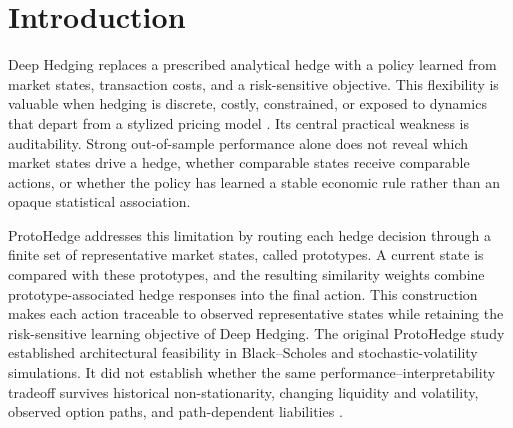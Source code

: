 \documentclass[sigconf]{acmart}
\begin{document}




\maketitle


\section{Introduction}
Deep Hedging replaces a prescribed analytical hedge with a policy learned
from market states, transaction costs, and a risk-sensitive objective. This
flexibility is valuable when hedging is discrete, costly, constrained, or
exposed to dynamics that depart from a stylized pricing model
\cite{buehler2019deep}. Its central
practical weakness is auditability. Strong out-of-sample performance alone
does not reveal which market states drive a hedge, whether comparable states
receive comparable actions, or whether the policy has learned a stable
economic rule rather than an opaque statistical association.

ProtoHedge addresses this limitation by routing each hedge decision through a
finite set of representative market states, called prototypes. A current
state is compared with these prototypes, and the resulting similarity weights
combine prototype-associated hedge responses into the final action. This
construction makes each action traceable to observed representative states
while retaining the risk-sensitive learning objective of Deep Hedging. The
original ProtoHedge study established architectural feasibility in
Black--Scholes and stochastic-volatility simulations. It did not establish
whether the same performance--interpretability tradeoff survives historical
non-stationarity, changing liquidity and volatility, observed option paths,
and path-dependent liabilities \cite{faloughi2025protohedge}.
\end{document}
